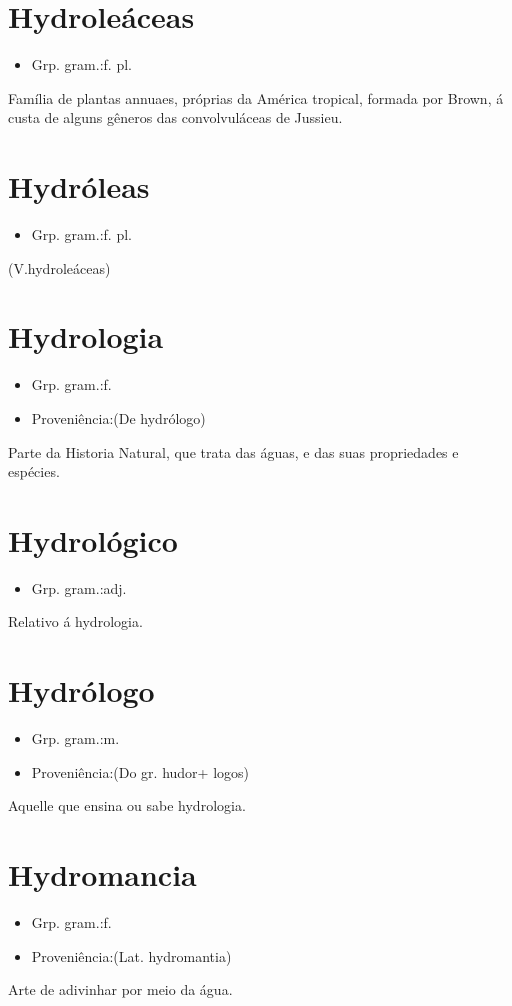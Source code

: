 \documentclass{article}
\begin{document}
\section{Hydroleáceas}
\begin{itemize}
\item {Grp. gram.:f. pl.}
\end{itemize}
Família de plantas annuaes, próprias da América tropical, formada por Brown, á custa de alguns gêneros das convolvuláceas de Jussieu.
\section{Hydróleas}
\begin{itemize}
\item {Grp. gram.:f. pl.}
\end{itemize}
(V.hydroleáceas)
\section{Hydrologia}
\begin{itemize}
\item {Grp. gram.:f.}
\end{itemize}
\begin{itemize}
\item {Proveniência:(De \textunderscore hydrólogo\textunderscore )}
\end{itemize}
Parte da Historia Natural, que trata das águas, e das suas propriedades e espécies.
\section{Hydrológico}
\begin{itemize}
\item {Grp. gram.:adj.}
\end{itemize}
Relativo á hydrologia.
\section{Hydrólogo}
\begin{itemize}
\item {Grp. gram.:m.}
\end{itemize}
\begin{itemize}
\item {Proveniência:(Do gr. \textunderscore hudor\textunderscore  + \textunderscore logos\textunderscore )}
\end{itemize}
Aquelle que ensina ou sabe hydrologia.
\section{Hydromancia}
\begin{itemize}
\item {Grp. gram.:f.}
\end{itemize}
\begin{itemize}
\item {Proveniência:(Lat. \textunderscore hydromantia\textunderscore )}
\end{itemize}
Arte de adivinhar por meio da água.
\end{document}

